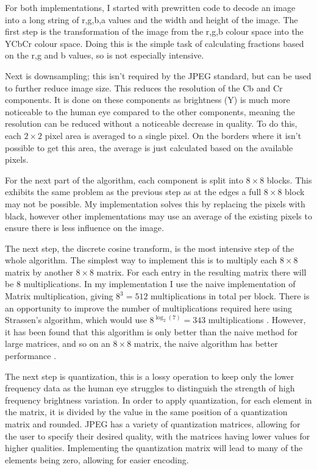 \documentclass[12pt,a4paper]{article}
\begin{document}
For both implementations, I started with prewritten code to decode an image into a long string of r,g,b,a values and the width and height of the image. The first step is the transformation of the image from the r,g,b colour space into the YCbCr colour space. Doing this is the simple task of calculating fractions based on the r,g and b values, so is not especially intensive.

Next is downsampling; this isn't required by the JPEG standard, but can be used to further reduce image size. This reduces the resolution of the Cb and Cr components. It is done on these components as brightness (Y) is much more noticeable to the human eye compared to the other components, meaning the resolution can be reduced without a noticeable decrease in quality. To do this, each $2\times 2$ pixel area is averaged to a single pixel. On the borders where it isn't possible to get this area, the average is just calculated based on the available pixels.

For the next part of the algorithm, each component is split into $8\times 8$ blocks. This exhibits the same problem as the previous step as at the edges a full $8\times 8$ block may not be possible. My implementation solves this by replacing the pixels with black, however other implementations may use an average of the existing pixels to ensure there is less influence on the image.

The next step, the discrete cosine transform, is the most intensive step of the whole algorithm. The simplest way to implement this is to multiply each $8\times 8$ matrix by another $8\times 8$ matrix. For each entry in the resulting matrix there will be $8$ multiplications. In my implementation I use the naive implementation of Matrix multiplication, giving $8^3 = 512$ multiplications in total per block. There is an opportunity to improve the number of multiplications required here using Strassen's algorithm, which would use $8^{\log_2(7)}=343$ multiplications \cite{strassen1969gaussian}. However, it has been found that this algorithm is only better than the naive method for large matrices, and so on an $8\times 8$ matrix, the naive algorithm has better performance \cite{huang2016strassen}.



The next step is quantization, this is a lossy operation to keep only the lower frequency data as the human eye struggles to distinguish the strength of high frequency brightness variation. In order to apply quantization, for each element in the matrix, it is divided by the value in the same position of a quantization matrix and rounded. JPEG has a variety of quantization matrices, allowing for the user to specify their desired quality, with the matrices having lower values for higher qualities. Implementing the quantization matrix will lead to many of the elements being zero, allowing for easier encoding.
\end{document}

